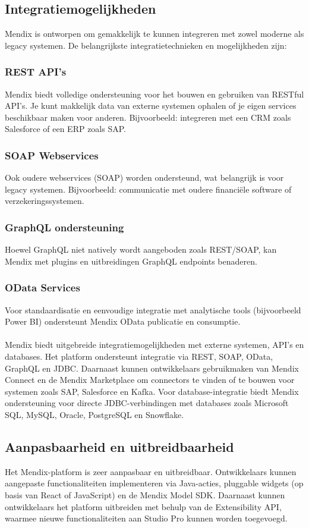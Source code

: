 \subsection{Integratiemogelijkheden}
Mendix is ontworpen om gemakkelijk te kunnen integreren met zowel moderne als legacy systemen. De belangrijkste integratietechnieken en mogelijkheden zijn:
\subsubsection{REST API's}
Mendix biedt volledige ondersteuning voor het bouwen en gebruiken van RESTful API's. Je kunt makkelijk data van externe systemen ophalen of je eigen services beschikbaar maken voor anderen.
Bijvoorbeeld: integreren met een CRM zoals Salesforce of een ERP zoals SAP.
\subsubsection{SOAP Webservices}
Ook oudere webservices (SOAP) worden ondersteund, wat belangrijk is voor legacy systemen.
Bijvoorbeeld: communicatie met oudere financiële software of verzekeringssystemen.

\subsubsection{GraphQL ondersteuning}
Hoewel GraphQL niet natively wordt aangeboden zoals REST/SOAP, kan Mendix met plugins en uitbreidingen GraphQL endpoints benaderen.

\subsubsection{OData Services}
Voor standaardisatie en eenvoudige integratie met analytische tools (bijvoorbeeld Power BI) ondersteunt Mendix OData publicatie en consumptie.
\\
\\
Mendix biedt uitgebreide integratiemogelijkheden met externe systemen, API’s en databases. Het platform ondersteunt integratie via REST, SOAP, OData, GraphQL en JDBC. Daarnaast kunnen ontwikkelaars gebruikmaken van Mendix Connect en de Mendix Marketplace om connectors te vinden of te bouwen voor systemen zoals SAP, Salesforce en Kafka. Voor database-integratie biedt Mendix ondersteuning voor directe JDBC-verbindingen met databases zoals Microsoft SQL, MySQL, Oracle, PostgreSQL en Snowflake.

\subsection{Aanpasbaarheid en uitbreidbaarheid}
Het Mendix-platform is zeer aanpasbaar en uitbreidbaar. Ontwikkelaars kunnen aangepaste functionaliteiten implementeren via Java-acties, pluggable widgets (op basis van React of JavaScript) en de Mendix Model SDK. Daarnaast kunnen ontwikkelaars het platform uitbreiden met behulp van de Extensibility API, waarmee nieuwe functionaliteiten aan Studio Pro kunnen worden toegevoegd.


